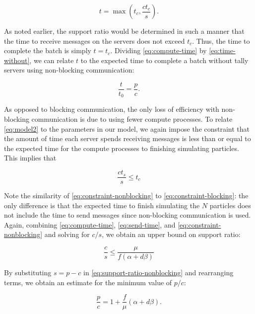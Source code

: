 \begin{equation}
  \label{eq:time-nonblocking}
  t = \max \left ( t_c, \frac{ct_c}{s} \right ).
\end{equation}

\noindent As noted earlier, the support ratio would be determined in such a
manner that the time to receive messages on the servers does not exceed
$t_c$. Thus, the time to complete the batch is simply $t = t_c$. Dividing
\eqref{eq:compute-time} by \eqref{eq:time-without}, we can relate $t$ to the
expected time to complete a batch without tally servers using non-blocking
communication:

\begin{equation}
  \label{eq:model2}
  \frac{t}{t_0} = \frac{p}{c}.
\end{equation}

\noindent As opposed to blocking communication, the only loss of efficiency with
non-blocking communication is due to using fewer compute processes. To relate
\eqref{eq:model2} to the parameters in our model, we again impose the constraint
that the amount of time each server spends receiving messages is less than or
equal to the expected time for the compute processes to finishing simulating
particles. This implies that

\begin{equation}
  \label{eq:constraint-nonblocking}
  \frac{ct_s}{s} \le t_c
\end{equation}

\noindent Note the similarity of \eqref{eq:constraint-nonblocking} to
\eqref{eq:constraint-blocking}: the only difference is that the expected time to
finish simulating the $N$ particles does not include the time to send messages
since non-blocking communication is used. Again, combining
\eqref{eq:compute-time}, \eqref{eq:send-time}, and
\eqref{eq:constraint-nonblocking} and solving for $c/s$, we obtain an upper
bound on support ratio:

\begin{equation}
  \label{eq:support-ratio-nonblocking}
  \frac{c}{s} \le \frac{\mu}{f \left ( \alpha + d\beta \right )}
\end{equation}

\noindent By substituting $s = p - c$ in \eqref{eq:support-ratio-nonblocking}
and rearranging terms, we obtain an estimate for the minimum value of $p/c$:

\begin{equation}
  \label{eq:ratio-nonblocking}
  \frac{p}{c} = 1 + \frac{f}{\mu} \left ( \alpha + d \beta \right ).
\end{equation}

